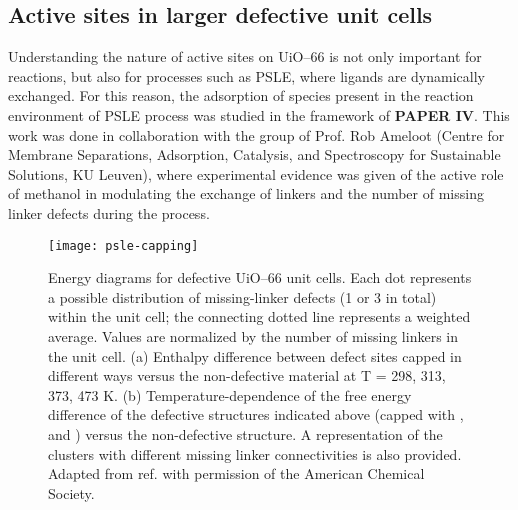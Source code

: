 \subsection*{Active sites in larger defective unit cells}
Understanding the nature of active sites on UiO--66 is not only important for reactions, but also for processes such as PSLE, where ligands are dynamically exchanged. For this reason, the adsorption of species present in the reaction environment of PSLE process was studied in the framework of \textbf{PAPER IV}. This work was done in collaboration with the group of Prof. Rob Ameloot (Centre for Membrane Separations, Adsorption, Catalysis, and Spectroscopy for Sustainable Solutions, KU Leuven), where experimental evidence was given of the active role of methanol in modulating the exchange of linkers and the number of missing linker defects during the process. 
\npar
\begin{figure}[!htbp]
	\centering
	\texttt{[image: psle-capping]}
	\caption{Energy diagrams for defective UiO--66 unit cells. Each dot represents a possible distribution of missing-linker defects (1 or 3 in total) within the unit cell; the connecting dotted line represents a weighted average. Values are normalized by the number of missing linkers in the unit cell. (a) Enthalpy difference between defect sites capped in different ways versus the non-defective material at T = 298, 313, 373, 473 K. (b) Temperature-dependence of the free energy difference of the defective structures indicated above (capped with ,  and ) versus the non-defective structure. A representation of the clusters with different missing linker connectivities is also provided. Adapted from ref. \cite{marreiros2019active} with permission of the American Chemical Society.}
	\label{fig:psle-capping}
\end{figure}
